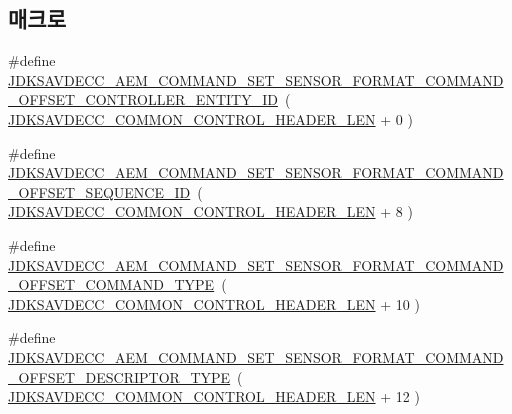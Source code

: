 \subsection*{매크로}
\begin{DoxyCompactItemize}
\item 
\#define \hyperlink{group__command__set__sensor__format_gaa8fec9b4d4cb4bc40d738d8e97309ad8}{J\+D\+K\+S\+A\+V\+D\+E\+C\+C\+\_\+\+A\+E\+M\+\_\+\+C\+O\+M\+M\+A\+N\+D\+\_\+\+S\+E\+T\+\_\+\+S\+E\+N\+S\+O\+R\+\_\+\+F\+O\+R\+M\+A\+T\+\_\+\+C\+O\+M\+M\+A\+N\+D\+\_\+\+O\+F\+F\+S\+E\+T\+\_\+\+C\+O\+N\+T\+R\+O\+L\+L\+E\+R\+\_\+\+E\+N\+T\+I\+T\+Y\+\_\+\+ID}~( \hyperlink{group__jdksavdecc__avtp__common__control__header_gaae84052886fb1bb42f3bc5f85b741dff}{J\+D\+K\+S\+A\+V\+D\+E\+C\+C\+\_\+\+C\+O\+M\+M\+O\+N\+\_\+\+C\+O\+N\+T\+R\+O\+L\+\_\+\+H\+E\+A\+D\+E\+R\+\_\+\+L\+EN} + 0 )
\item 
\#define \hyperlink{group__command__set__sensor__format_ga0c0bcf16913f9d93f5b6831d9e520708}{J\+D\+K\+S\+A\+V\+D\+E\+C\+C\+\_\+\+A\+E\+M\+\_\+\+C\+O\+M\+M\+A\+N\+D\+\_\+\+S\+E\+T\+\_\+\+S\+E\+N\+S\+O\+R\+\_\+\+F\+O\+R\+M\+A\+T\+\_\+\+C\+O\+M\+M\+A\+N\+D\+\_\+\+O\+F\+F\+S\+E\+T\+\_\+\+S\+E\+Q\+U\+E\+N\+C\+E\+\_\+\+ID}~( \hyperlink{group__jdksavdecc__avtp__common__control__header_gaae84052886fb1bb42f3bc5f85b741dff}{J\+D\+K\+S\+A\+V\+D\+E\+C\+C\+\_\+\+C\+O\+M\+M\+O\+N\+\_\+\+C\+O\+N\+T\+R\+O\+L\+\_\+\+H\+E\+A\+D\+E\+R\+\_\+\+L\+EN} + 8 )
\item 
\#define \hyperlink{group__command__set__sensor__format_gae53411d793734581c38b820be09e73ff}{J\+D\+K\+S\+A\+V\+D\+E\+C\+C\+\_\+\+A\+E\+M\+\_\+\+C\+O\+M\+M\+A\+N\+D\+\_\+\+S\+E\+T\+\_\+\+S\+E\+N\+S\+O\+R\+\_\+\+F\+O\+R\+M\+A\+T\+\_\+\+C\+O\+M\+M\+A\+N\+D\+\_\+\+O\+F\+F\+S\+E\+T\+\_\+\+C\+O\+M\+M\+A\+N\+D\+\_\+\+T\+Y\+PE}~( \hyperlink{group__jdksavdecc__avtp__common__control__header_gaae84052886fb1bb42f3bc5f85b741dff}{J\+D\+K\+S\+A\+V\+D\+E\+C\+C\+\_\+\+C\+O\+M\+M\+O\+N\+\_\+\+C\+O\+N\+T\+R\+O\+L\+\_\+\+H\+E\+A\+D\+E\+R\+\_\+\+L\+EN} + 10 )
\item 
\#define \hyperlink{group__command__set__sensor__format_gace515c24588c3ae825ba2d012e5b4257}{J\+D\+K\+S\+A\+V\+D\+E\+C\+C\+\_\+\+A\+E\+M\+\_\+\+C\+O\+M\+M\+A\+N\+D\+\_\+\+S\+E\+T\+\_\+\+S\+E\+N\+S\+O\+R\+\_\+\+F\+O\+R\+M\+A\+T\+\_\+\+C\+O\+M\+M\+A\+N\+D\+\_\+\+O\+F\+F\+S\+E\+T\+\_\+\+D\+E\+S\+C\+R\+I\+P\+T\+O\+R\+\_\+\+T\+Y\+PE}~( \hyperlink{group__jdksavdecc__avtp__common__control__header_gaae84052886fb1bb42f3bc5f85b741dff}{J\+D\+K\+S\+A\+V\+D\+E\+C\+C\+\_\+\+C\+O\+M\+M\+O\+N\+\_\+\+C\+O\+N\+T\+R\+O\+L\+\_\+\+H\+E\+A\+D\+E\+R\+\_\+\+L\+EN} + 12 )

\end{DoxyCompactItemize}

